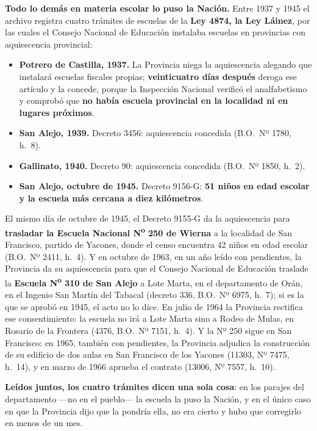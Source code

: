 \textbf{Todo lo demás en materia escolar lo puso la Nación.} Entre 1937 y 1945 el archivo
registra cuatro trámites de escuelas de la \textbf{Ley 4874, la Ley Láinez}, por las cuales el
Consejo Nacional de Educación instalaba escuelas en provincias con aquiescencia provincial:

\begin{itemize}[leftmargin=*,itemsep=2pt]
\item \textbf{Potrero de Castilla, 1937.} La Provincia niega la aquiescencia alegando que
instalará escuelas fiscales propias; \textbf{veinticuatro días después} deroga ese artículo y la
concede, porque la Inspección Nacional verificó el analfabetismo y comprobó que \textbf{no había
escuela provincial en la localidad ni en lugares próximos}.
\item \textbf{San Alejo, 1939.} Decreto 3456: aquiescencia concedida (B.O.\ Nº 1780, h.\ 8).
\item \textbf{Gallinato, 1940.} Decreto 90: aquiescencia concedida (B.O.\ Nº 1850, h.\ 2).
\item \textbf{San Alejo, octubre de 1945.} Decreto 9156-G: \textbf{51 niños en edad escolar y la
escuela más cercana a diez kilómetros}.
\end{itemize}

El mismo día de octubre de 1945, el Decreto 9155-G da la aquiescencia para \textbf{trasladar la Escuela Nacional
N\textsuperscript{o} 250 de Wierna} a la localidad de San Francisco, partido de Yacones, donde el censo encuentra 42 niños en edad escolar (B.O.\ Nº 2411, h.\ 4). Y en octubre de 1963, en un año leído con pendientes, la Provincia da su aquiescencia para que el Consejo Nacional de Educación traslade la \textbf{Escuela N\textsuperscript{o} 310 de San Alejo} a Lote Marta, en el departamento de Orán, en el Ingenio San Martín del Tabacal (decreto 336, B.O.\ Nº 6975, h.\ 7); si es la que se aprobó en 1945, el acto no lo dice. En julio de 1964 la Provincia rectifica ese consentimiento: la escuela no irá a Lote Marta sino a Rodeo de Mulas, en Rosario de la Frontera (4376, B.O.\ Nº 7151, h.\ 4). Y la Nº 250 sigue en San Francisco: en 1965, también con pendientes, la Provincia adjudica la construcción de su edificio de dos aulas en San Francisco de los Yacones (11303, Nº 7475, h.\ 14), y en marzo de 1966 aprueba el contrato (13006, Nº 7557, h.\ 10).

\textbf{Leídos juntos, los cuatro trámites dicen una sola cosa}: en los parajes del departamento
---no en el pueblo--- la escuela la puso la Nación, y en el único caso en que la Provincia dijo
que la pondría ella, no era cierto y hubo que corregirlo en menos de un mes.

